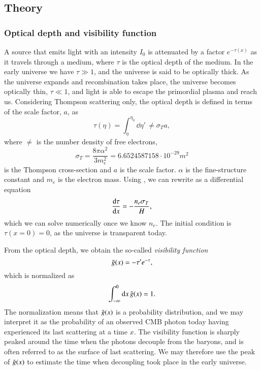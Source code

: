 

\subsection{Theory}\label{ssec:M2:theory}

\subsubsection{Optical depth and visibility function} \label{sssec:M2:optical_depth_and_visibility_function}

A source that emits light with an intensity $I_0$ is attenuated by a factor $e^{-\tau(x)}$ as it travels through a medium, where $\tau$ is the optical depth of the medium. In the early universe we have $\tau\gg1$, and the universe is said to be optically thick. As the universe expands and recombination takes place, the universe becomes optically thin, $\tau\ll1$, and light is able to escape the primordial plasma and reach us. Considering Thompson scattering only, the optical depth is defined in terms of the scale factor, $a$, as \cite[Eq. (5)]{callin} 
\begin{equation} \label{eq:M2:theory:optical_depth_integral_definition}
    \tau(\eta) = \int_\eta^{\eta_0} \dd \eta' \,\ne \sigma_T a,
\end{equation}
where $\ne$ is the number density of free electrons,
\begin{equation} \label{eq:M2:theory:thomspon_cross_section}
    \sigma_T=\frac{8\pi\alpha^2}{3 m_e^2} = 6.6524587158\cdot 10^{-29}\unit{m^2} 
\end{equation}
is the Thompson cross-section and $a$ is the scale factor. $\alpha$ is the fine-structure constant and $m_e$ is the electron mass. Using , we can rewrite  as a differential equation 
\begin{equation} \label{eq:M2:theory:tau_ODE}
    \dv{\tau}{x} = - \frac{n_e \sigma_T}{H},
\end{equation}
which we can solve numerically once we know $n_e$. The initial condition is $\tau(x=0)=0$, as the universe is transparent today.

From the optical depth, we obtain the so-called \textit{visibility function} \cite[Eq. (8)]{callin} 
\begin{equation} \label{eq:M2:theory:g_tilde_of_x_definition}
    \tilde{g}(x) = -\tau' e^{-\tau},
\end{equation}
which is normalized as 
\begin{equation} \label{eq:M2:theory:g_tilde_normalization}
    \int_{-\infty}^0\dd x\,\tilde{g}(x) = 1.
\end{equation}
The normalization means that $\tilde{g}(x)$ is a probability distribution, and we may interpret it as the probability of an observed CMB photon today having experienced its last scattering at a time $x$. The visibility function is sharply peaked around the time when the photons decouple from the baryons, and is often referred to as the surface of last scattering. We may therefore use the peak of $\tilde{g}(x)$ to estimate the time when decoupling took place in the early universe. 

